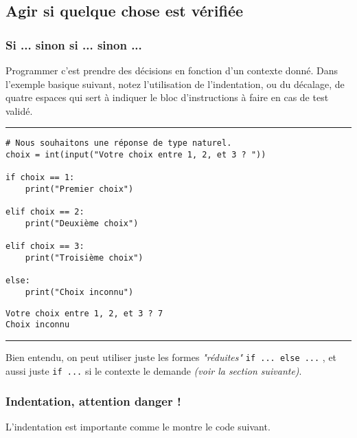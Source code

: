 \subsection{Agir si quelque chose est vérifiée}

\subsubsection{Si ... sinon si ... sinon ...}

Programmer c'est prendre des décisions en fonction d'un contexte donné. Dans l'exemple basique suivant, notez l'utilisation de l'indentation, ou du décalage, de quatre espaces qui sert à indiquer le bloc d'instructions à faire en cas de test validé.


\bigskip
{\hrule height .5mm}
\begin{verbatim}
# Nous souhaitons une réponse de type naturel.
choix = int(input("Votre choix entre 1, 2, et 3 ? "))

if choix == 1:
    print("Premier choix")

elif choix == 2:
    print("Deuxième choix")

elif choix == 3:
    print("Troisième choix")

else:
    print("Choix inconnu")
\end{verbatim}
 \color{ForestGreen}
\vspace{-1.5em}
\begin{verbatim}
Votre choix entre 1, 2, et 3 ? 7
Choix inconnu
\end{verbatim} \color{Black}
{\hrule height .5mm}
\bigskip


Bien entendu, on peut utiliser juste les formes \textit{"réduites"} \texttt{if ... else ...} , et aussi juste \texttt{if ...} si le contexte le demande \textit{(voir la section suivante)}.


\subsubsection{Indentation, attention danger !}

L'indentation est importante comme le montre le code suivant.


